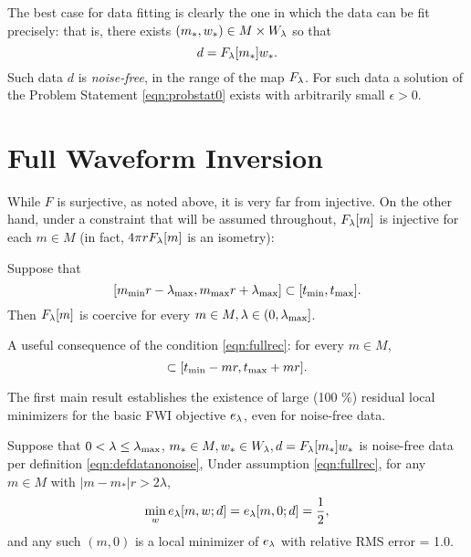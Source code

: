 The best case for data fitting
is clearly the one in which the data can be fit precisely: that is,
there exists $(m_*,w_*) \in M\times W_{\lambda}$ so that
\begin{equation}
  \label{eqn:defdatanonoise}
  d=F_{\lambda}[m_*]w_*.
\end{equation}
Such data $d$ is {\em noise-free}, in the range of the map $F_{\lambda}$. For
such data a solution of the Problem Statement \ref{eqn:probstat0}
exists with arbitrarily small $\epsilon>0$.


\section{Full Waveform Inversion}
While $F$ is surjective, as noted above, it is
very far from injective. On the other hand, under a constraint that
will be assumed throughout, $F_{\lambda}[m]$ is injective for each $m \in M$ (in fact, $4 \pi r
F_{\lambda}[m]$ is an isometry):
\begin{proposition}
  \label{thm:fullrec}
  Suppose that 
  \begin{equation}
    \label{eqn:fullrec}
    [ m_{\rm min}r-\lambda_{\rm max}, m_{\rm max}r+\lambda_{\rm max}]
    \subset [t_{\rm min},t_{\rm max}].
  \end{equation}
  Then $F_{\lambda}[m]$ is coercive for every $m \in M, \lambda \in
  (0,\lambda_{\rm max}]$.
\end{proposition}

 A useful consequence of the condition 
\ref{eqn:fullrec}: for every $m \in M$, 
\begin{equation}
  [-\lambda_{\rm max}, \lambda_{\rm max}] \subset[ t_{\rm min}-mr , 
  t_{\rm max}+mr]. 
  \label{eqn:zeroinc}
\end{equation}

The first main result establishes the existence of large (100 \%)
residual local minimizers for the basic FWI objective $e_{\lambda}$, even
for noise-free data.
\begin{theorem}
  \label{thm:fwi}
  Suppose that $0 <\lambda\le \lambda_{\rm max}$,  $m_* \in M, w_*
  \in W_{\lambda}, d=F_{\lambda}[m_*]w_*$ is noise-free data per definition \ref{eqn:defdatanonoise},
  Under assumption \ref{eqn:fullrec}, for any $m \in M$ with $|m-m_*|r>2\lambda$,
\begin{equation}
  \label{eqn:isovpm}
 \min_w e_{\lambda}[m,w;d]=e_{\lambda}[m,0;d] = \frac{1}{2},
\end{equation}
and any such $(m,0)$ is a local minimizer of $e_{\lambda}$ with relative RMS
error = 1.0.
\end{theorem}

